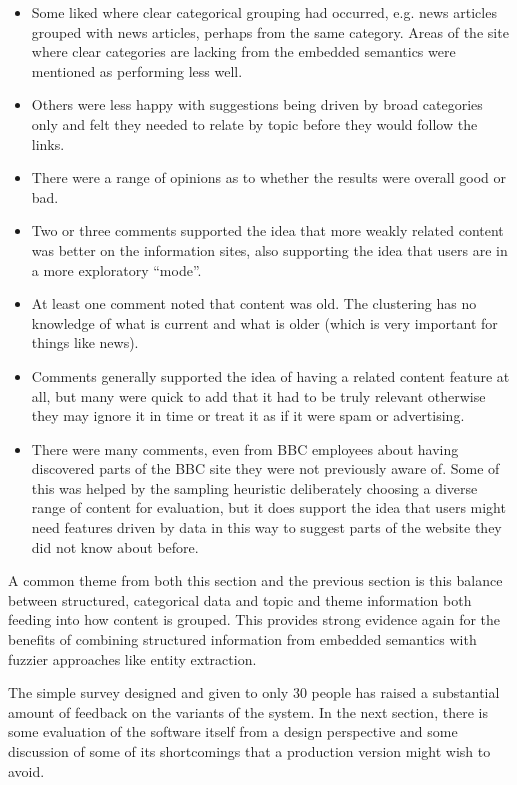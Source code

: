 \begin{itemize}
\item Some liked where clear categorical grouping had occurred, e.g.
  news articles grouped with news articles, perhaps from the same
  category. Areas of the site where clear categories are lacking
  from the embedded semantics were mentioned as performing less well.
\item Others were less happy with suggestions being driven by
  broad categories only and felt they needed to relate by topic
  before they would follow the links.
\item There were a range of opinions as to whether the results
  were overall good or bad.
\item Two or three comments supported the idea that more weakly
  related content was better on the information sites, also supporting
  the idea that users are in a more exploratory ``mode''.
\item At least one comment noted that content was old. The clustering
  has no knowledge of what is current and what is older (which is
  very important for things like news).
\item Comments generally supported the idea of having a related
  content feature at all, but many were quick to add that it had
  to be truly relevant otherwise they may ignore it in time or treat
  it as if it were spam or advertising.
\item There were many comments, even from BBC employees about
  having discovered parts of the BBC site they were not previously
  aware of. Some of this was helped by the sampling heuristic
  deliberately choosing a diverse range of content for evaluation, but
  it does support the idea that users might need features driven by
  data in this way to suggest parts of the website they did not
  know about before.
\end{itemize}

A common theme from both this section and the previous section is
this balance between structured, categorical data and topic and theme
information both feeding into how content is grouped. This provides
strong evidence again for the benefits of combining structured information
from embedded semantics with fuzzier approaches like entity extraction.

The simple survey designed and given to only 30 people has raised
a substantial amount of feedback on the variants of the system. In
the next section, there is some evaluation of the software itself
from a design perspective and some discussion of some of its
shortcomings that a production version might wish to avoid.

